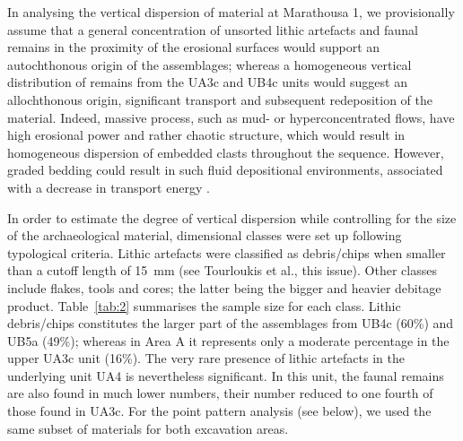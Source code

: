 \documentclass[preprint,authoryear,times]{elsarticle} %
\begin{document}
In analysing the vertical dispersion of material at Marathousa 1, we provisionally assume that a general concentration of unsorted lithic artefacts and faunal remains in the proximity of the erosional surfaces would support an autochthonous origin of the assemblages; whereas a homogeneous vertical distribution of remains from the UA3c and UB4c units would suggest an allochthonous origin, significant transport and subsequent redeposition of the material. Indeed, massive process, such as mud- or hyperconcentrated flows, have high erosional power and rather chaotic structure, which would result in homogeneous dispersion of embedded clasts throughout the sequence. However, graded bedding could result in such fluid depositional environments, associated with a decrease in transport energy \citep{}.

In order to estimate the degree of vertical dispersion while controlling for the size of the archaeological material, dimensional classes were set up following typological criteria. Lithic artefacts were classified as debris/chips when smaller than a cutoff length of 15~mm (see Tourloukis et al., this issue). Other classes include flakes, tools and cores; the latter being the bigger and heavier debitage product. Table~\ref{tab:2} summarises the sample size for each class. Lithic debris/chips constitutes the larger part of the assemblages from UB4c (60\%) and UB5a (49\%); whereas in Area A it represents only a moderate percentage in the upper UA3c unit (16\%). The very rare presence of lithic artefacts in the underlying unit UA4 is nevertheless significant. In this unit, the faunal remains are also found in much lower numbers, their number reduced to one fourth of those found in UA3c. For the point pattern analysis (see below), we used the same subset of materials for both excavation areas.
\end{document}
